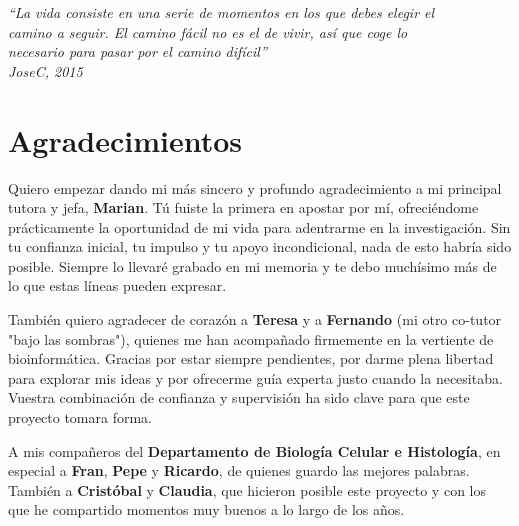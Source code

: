 \documentclass[10pt,a4paper]{article}
\begin{document}
\newpage
\thispagestyle{empty}
\mbox{}

\newpage
\thispagestyle{empty}
\vspace*{\fill}
\begin{flushright}
  \itshape
  ``La vida consiste en una serie de momentos en los que debes elegir el \\
  camino a seguir. El camino fácil no es el de vivir, así que coge lo \\ 
  necesario para pasar por el camino difícil''\\[1.5em]
  \normalfont
  JoseC, 2015
\end{flushright}
\vspace*{\fill}

\newpage
\thispagestyle{empty}
\mbox{}

\newpage
\section*{Agradecimientos}
Quiero empezar dando mi más sincero y profundo agradecimiento a mi principal tutora y jefa, \textbf{Marian}. Tú fuiste la primera en apostar por mí, ofreciéndome prácticamente la oportunidad de mi vida para adentrarme en la investigación. Sin tu confianza inicial, tu impulso y tu apoyo incondicional, nada de esto habría sido posible. Siempre lo llevaré grabado en mi memoria y te debo muchísimo más de lo que estas líneas pueden expresar.

También quiero agradecer de corazón a \textbf{Teresa} y a \textbf{Fernando} (mi otro co-tutor "bajo las sombras"), quienes me han acompañado firmemente en la vertiente de bioinformática. Gracias por estar siempre pendientes, por darme plena libertad para explorar mis ideas y por ofrecerme guía experta justo cuando la necesitaba. Vuestra combinación de confianza y supervisión ha sido clave para que este proyecto tomara forma.

A mis compañeros del \textbf{Departamento de Biología Celular e Histología}, en especial a \textbf{Fran}, \textbf{Pepe} y \textbf{Ricardo}, de quienes guardo las mejores palabras. También a \textbf{Cristóbal} y \textbf{Claudia}, que hicieron posible este proyecto y con los que he compartido momentos muy buenos a lo largo de los años. 
\end{document}
